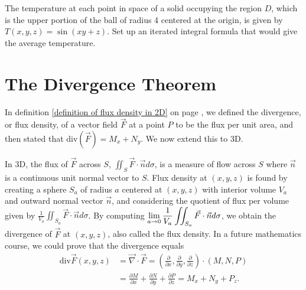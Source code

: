 \begin{problem}
The temperature at each point in space of a solid occupying the region {$D$}, which is the upper portion of the ball of radius 4 centered at the origin, is given by $T(x,y,z) = \sin(xy+z)$.  Set up an iterated integral formula that would give the average temperature.   
\end{problem}







\section{The Divergence Theorem}


In definition \ref{definition of flux density in 2D} on page \pageref{definition of flux density in 2D}, we defined the divergence, or flux density, of a vector field $\vec F$ at a point $P$ to be the flux per unit area, and then stated that $\text{div}(\vec F)=M_x+N_y$. We now extend this to 3D.

In 3D, the flux of $\vec F$ across $S$, $\iint_S\vec F\cdot \vec n d\sigma$, is a measure of flow across $S$ where $\vec n$ is a continuous unit normal vector to $S$.  Flux density at $(x,y,z)$ is found by creating a sphere $S_a$ of radius $a$ centered at $(x,y,z)$ with interior volume $V_a$ and outward normal vector $\vec n$, and considering the quotient of flux per volume given by $\frac{1}{V_a}\iint_{S_a} \vec F \cdot \vec n d\sigma$. By computing $\displaystyle \lim_{a\to 0}\frac{1}{V_a}\iint_{S_a} \vec F \cdot \vec n d\sigma$, we obtain the divergence of $\vec F$ at $(x,y,z)$, also called the flux density. In a future mathematics course, we could prove that the divergence equals
\begin{align*}
\text{div}\vec F(x,y,z) 
&= \vec \nabla\cdot \vec F 
= \left(\frac{\partial }{\partial x},\frac{\partial }{\partial y},\frac{\partial }{\partial z} \right)\cdot (M,N,P) \\
&= \frac{\partial M}{\partial x}+\frac{\partial N}{\partial y}+\frac{\partial P}{\partial z} 
= M_x+N_y+P_z 
.
\end{align*}


